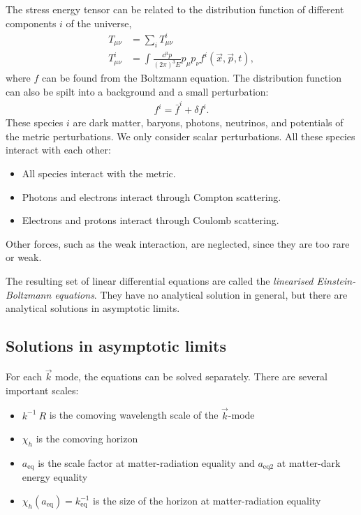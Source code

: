 The stress energy tensor can be related to the distribution function of different components $i$ of the universe,
\begin{align*}
	T_{\mu\nu} &= \sum_{i} T^{i}_{\mu\nu}\\
	T^{i}_{\mu\nu} &= \int \frac{\dd{^3p}}{(2\pi)^3 E} p_\mu p_\nu f^i(\vec{x},\vec{p},t),
\end{align*}
where $f$ can be found from the Boltzmann equation. The distribution function can also be spilt into a background and a small perturbation:
\begin{align*}
	f^i = \bar{f}^i + \delta f^i.
\end{align*}
These species $i$ are dark matter, baryons, photons, neutrinos, and potentials of the metric perturbations. We only consider scalar perturbations. All these species interact with each other:
\begin{itemize}
	\item All species interact with the metric.
	\item Photons and electrons interact through Compton scattering.
	\item Electrons and protons interact through Coulomb scattering.
\end{itemize}
Other forces, such as the weak interaction, are neglected, since they are too rare or weak.

The resulting set of linear differential equations are called the \emph{linearised Einstein-Boltzmann equations}. They have no analytical solution in general, but there are analytical solutions in asymptotic limits.

\subsection*{Solutions in asymptotic limits}
For each $\vec{k}$ mode, the equations can be solved separately. There are several important scales:
\begin{itemize}
	\item $k^{-1}~R$ is the comoving wavelength scale of the $\vec{k}$-mode
	\item $\chi_h$ is the comoving horizon
	\item $a_\text{eq}$ is the scale factor at matter-radiation equality and $a_{\text{eq2}}$ at matter-dark energy equality
	\item $\chi_h(a_\text{eq})=k_\text{eq}^{-1}$ is the size of the horizon at matter-radiation equality
\end{itemize}

